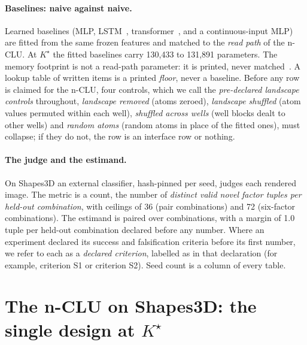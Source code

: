 \documentclass{article} %
\newcommand{\Kstar}{\ensuremath{K^{\star}}}
\begin{document}
\paragraph{Baselines: naive against naive.} Learned baselines (MLP, LSTM~\citep{hochreiter1997long}, transformer~\citep{vaswani2017attention}, and a
continuous-input MLP) are fitted from the same frozen features and matched to the
\emph{read path} of the n-CLU. At $\Kstar$ the fitted baselines carry 130,433 to 131,891 parameters.
The memory footprint is not a read-path parameter: it is printed, never matched~\citep{borgeaud2021improving,khandelwal2020generalization,lample2019large}. A lookup table
of written items is a printed \emph{floor}, never a baseline. Before any row is claimed for the
n-CLU, four controls, which we call the \emph{pre-declared landscape controls} throughout, \emph{landscape removed} (atoms zeroed), \emph{landscape shuffled} (atom values permuted within each well), \emph{shuffled across wells}
(well blocks dealt to other wells) and \emph{random atoms} (random atoms in place of the fitted ones), must collapse; if they do
not, the row is an interface row or nothing.

\paragraph{The judge and the estimand.} On Shapes3D an external classifier, hash-pinned per seed, judges each rendered image. The metric is a count, the number of \emph{distinct
valid novel factor tuples per held-out combination}, with ceilings of 36 (pair combinations) and 72 (six-factor
combinations). The estimand is paired over combinations, with a margin of 1.0 tuple per held-out combination declared
before any number. %
Where an experiment declared its success and falsification criteria before its first
number, we refer to each as a \emph{declared criterion}, labelled as in that
declaration (for example, criterion S1 or criterion S2).
Seed count is a column of every table.

\section{The n-CLU on Shapes3D: the single design at $\Kstar$}
\label{sec:shapes}
\end{document}

